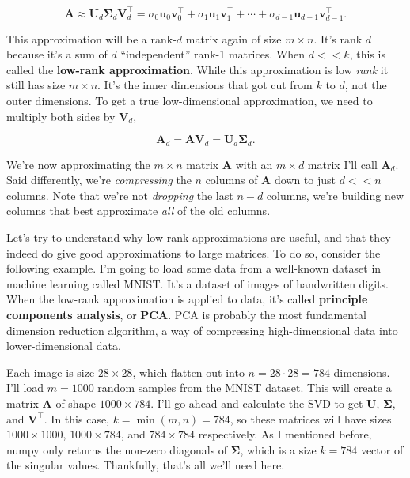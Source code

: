 \documentclass[
  letterpaper,
  DIV=11,
  numbers=noendperiod]{scrreprt}
\begin{document}
\[\mathbf{A} \approx \mathbf{U}_d \mathbf{\Sigma}_d \mathbf{V}_d^\top = \sigma_0 \mathbf{u}_0 \mathbf{v}_0^\top + \sigma_1 \mathbf{u}_1 \mathbf{v}_1^\top + \cdots + \sigma_{d-1} \mathbf{u}_{d-1} \mathbf{v}_{d-1}^\top.\]

This approximation will be a rank-\(d\) matrix again of size
\(m \times n\). It's rank \(d\) because it's a sum of \(d\)
``independent'' rank-1 matrices. When \(d<<k\), this is called the
\textbf{low-rank approximation}. While this approximation is low
\emph{rank} it still has size \(m \times n\). It's the inner dimensions
that got cut from \(k\) to \(d\), not the outer dimensions. To get a
true low-dimensional approximation, we need to multiply both sides by
\(\mathbf{V}_d\),

\[\mathbf{A}_d =  \mathbf{A} \mathbf{V}_d = \mathbf{U}_d \mathbf{\Sigma}_d.\]

We're now approximating the \(m \times n\) matrix \(\mathbf{A}\) with an
\(m \times d\) matrix I'll call \(\mathbf{A}_d\). Said differently,
we're \emph{compressing} the \(n\) columns of \(\mathbf{A}\) down to
just \(d<<n\) columns. Note that we're not \emph{dropping} the last
\(n-d\) columns, we're building new columns that best approximate
\emph{all} of the old columns.

Let's try to understand why low rank approximations are useful, and that
they indeed do give good approximations to large matrices. To do so,
consider the following example. I'm going to load some data from a
well-known dataset in machine learning called MNIST. It's a dataset of
images of handwritten digits. When the low-rank approximation is applied
to data, it's called \textbf{principle components analysis}, or
\textbf{PCA}. PCA is probably the most fundamental dimension reduction
algorithm, a way of compressing high-dimensional data into
lower-dimensional data.

Each image is size \(28 \times 28\), which flatten out into
\(n = 28 \cdot 28 = 784\) dimensions. I'll load \(m=1000\) random
samples from the MNIST dataset. This will create a matrix \(\mathbf{A}\)
of shape \(1000 \times 784\). I'll go ahead and calculate the SVD to get
\(\mathbf{U}\), \(\mathbf{\Sigma}\), and \(\mathbf{V}^\top\). In this
case, \(k=\min(m,n)=784\), so these matrices will have sizes
\(1000 \times 1000\), \(1000 \times 784\), and \(784 \times 784\)
respectively. As I mentioned before, numpy only returns the non-zero
diagonals of \(\mathbf{\Sigma}\), which is a size \(k=784\) vector of
the singular values. Thankfully, that's all we'll need here.
\end{document}
